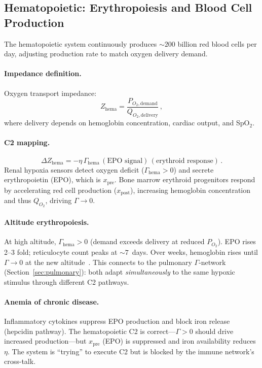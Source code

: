 \documentclass[aps,pre,twocolumn,superscriptaddress,floatfix]{revtex4-2}
\begin{document}
\subsection{Hematopoietic: Erythropoiesis and Blood Cell Production}
\label{sec:hematopoietic}

The hematopoietic system continuously produces $\sim 200$
billion red blood cells per day, adjusting production rate
to match oxygen delivery demand.

\paragraph{Impedance definition.}
Oxygen transport impedance:
\begin{equation}
  Z_{\text{hema}} =
  \frac{P_{O_2,\text{demand}}}
       {Q_{O_2,\text{delivery}}}\,,
  \label{eq:z-hema}
\end{equation}
where delivery depends on hemoglobin concentration,
cardiac output, and SpO$_2$.

\paragraph{C2 mapping.}
\begin{equation}
  \Delta Z_{\text{hema}} =
  -\eta\,\Gamma_{\text{hema}}\,
  (\text{EPO signal})\,
  (\text{erythroid response})\,.
  \label{eq:c2-hema}
\end{equation}
Renal hypoxia sensors detect oxygen deficit
($\Gamma_{\text{hema}} > 0$) and secrete
erythropoietin (EPO), which is $x_{\text{pre}}$.
Bone marrow erythroid progenitors respond
by accelerating red cell production
($x_{\text{post}}$), increasing hemoglobin
concentration and thus $Q_{O_2}$,
driving $\Gamma \to 0$.

\paragraph{Altitude erythropoiesis.}
At high altitude, $\Gamma_{\text{hema}} > 0$
(demand exceeds delivery at reduced $P_{O_2}$).
EPO rises 2--3 fold; reticulocyte count
peaks at $\sim 7$~days.  Over weeks,
hemoglobin rises until $\Gamma \to 0$ at the
new altitude~\cite{Hackett2001}.
This connects to the pulmonary $\Gamma$-network
(Section~\ref{sec:pulmonary}): both adapt
\emph{simultaneously} to the same hypoxic stimulus
through different C2 pathways.

\paragraph{Anemia of chronic disease.}
Inflammatory cytokines suppress EPO production
and block iron release (hepcidin pathway).
The hematopoietic C2 is correct---$\Gamma > 0$
should drive increased production---but
$x_{\text{pre}}$ (EPO) is suppressed and iron
availability reduces $\eta$.
The system is ``trying'' to execute C2 but is
blocked by the immune network's cross-talk.
\end{document}

